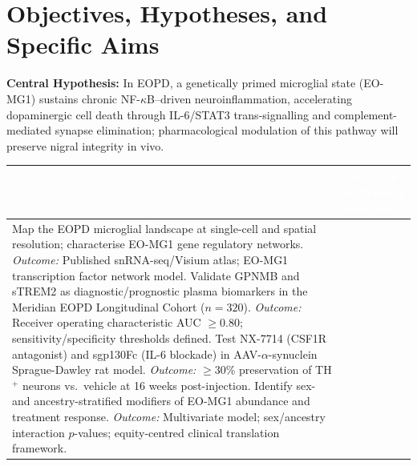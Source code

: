\section{Objectives, Hypotheses, and Specific Aims}

\begin{tcolorbox}[
  enhanced,
  colback=white,
  colframe=cihrNavy,
  sharp corners,
  boxrule=1pt,
  left=7pt, right=7pt, top=7pt, bottom=7pt,
  parbox=false
]
  \textbf{Central Hypothesis:} In EOPD, a genetically primed microglial state (EO-MG1) sustains chronic NF-$\kappa$B--driven neuroinflammation, accelerating dopaminergic cell death through IL-6/STAT3 trans-signalling and complement-mediated synapse elimination; pharmacological modulation of this pathway will preserve nigral integrity in vivo.
\end{tcolorbox}

\vspace{6pt}

\renewcommand{\arraystretch}{1.3}
\begin{tabularx}{\linewidth}{@{} p{2.6cm} X @{}}
  \toprule
  \rowcolor{cihrNavy}
  \multicolumn{1}{l}{\textcolor{white}{\textbf{Specific Aim}}} &
  \multicolumn{1}{l}{\textcolor{white}{\textbf{Objective \& Primary Outcome}}} \\
  \midrule
  \aimrow{Aim 1 (Yr 1--2)}{Map the EOPD microglial landscape at single-cell and spatial resolution; characterise EO-MG1 gene regulatory networks.\newline\textit{Outcome:} Published snRNA-seq/Visium atlas; EO-MG1 transcription factor network model.}
  \rowcolor{cihrLightGray}
  \aimrow{Aim 2 (Yr 1--3)}{Validate GPNMB and sTREM2 as diagnostic/prognostic plasma biomarkers in the Meridian EOPD Longitudinal Cohort ($n=320$).\newline\textit{Outcome:} Receiver operating characteristic AUC $\geq 0.80$; sensitivity/specificity thresholds defined.}
  \aimrow{Aim 3 (Yr 2--4)}{Test NX-7714 (CSF1R antagonist) and sgp130Fc (IL-6 blockade) in AAV-$\alpha$-synuclein Sprague-Dawley rat model.\newline\textit{Outcome:} $\geq$30\% preservation of TH$^{+}$ neurons vs.\ vehicle at 16 weeks post-injection.}
  \rowcolor{cihrLightGray}
  \aimrow{Aim 4 (Yr 3--4)}{Identify sex- and ancestry-stratified modifiers of EO-MG1 abundance and treatment response.\newline\textit{Outcome:} Multivariate model; sex/ancestry interaction $p$-values; equity-centred clinical translation framework.}
  \bottomrule
\end{tabularx}

